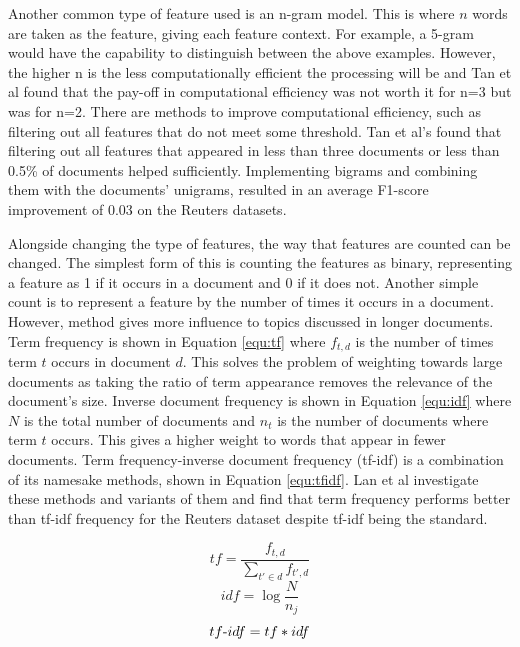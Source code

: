 			Another common type of feature used is an n-gram model. This is where $n$ words are taken as the feature, giving each feature context. For example, a 5-gram would have the capability to distinguish between the above examples. However, the higher n is the less computationally efficient the processing will be and Tan et al found that the pay-off in computational efficiency was not worth it for n=3 but was for n=2\cite{bigrams_enhance_tan}. There are methods to improve computational efficiency, such as filtering out all features that do not meet some threshold. Tan et al's found that filtering out all features that appeared in less than three documents or less than 0.5\% of documents helped sufficiently. Implementing bigrams and combining them with the documents' unigrams, resulted in an average F1-score improvement of 0.03 on the Reuters datasets\cite{bigrams_enhance_tan}. 

			Alongside changing the type of features, the way that features are counted can be changed. The simplest form of this is counting the features as binary, representing a feature as 1 if it occurs in a document and 0 if it does not. Another simple count is to represent a feature by the number of times it occurs in a document. However, method gives more influence to topics discussed in longer documents. Term frequency is shown in Equation \ref{equ:tf} where $f_{t,d}$ is the number of times term $t$ occurs in document $d$. This solves the problem of weighting towards large documents as taking the ratio of term appearance removes the relevance of the document's size. Inverse document frequency is shown in Equation \ref{equ:idf} where $N$ is the total number of documents and $n_t$ is the number of documents where term $t$ occurs. This gives a higher weight to words that appear in fewer documents. Term frequency-inverse document frequency (tf-idf) is a combination of its namesake methods, shown in Equation \ref{equ:tfidf}. Lan et al investigate these methods and variants of them and find that term frequency performs better than tf-idf frequency for the Reuters dataset despite tf-idf being the standard\cite{comparative_weighting_lan}.
			
			\begin{equation}\label{equ:tf}
				tf = \frac{f_{t,d}}{\sum_{t' \in d}f_{t',d}} 
			\end{equation}
			\begin{equation}\label{equ:idf}
				idf = \log \frac{N}{n_j}
			\end{equation}
			\begin{equation}\label{equ:tfidf}
				tf\textnormal{-}idf = tf * idf
			\end{equation}
			
